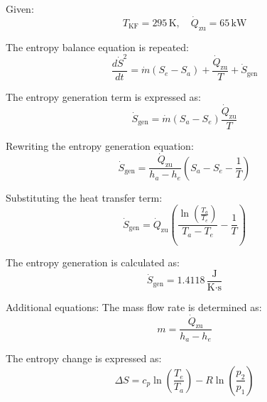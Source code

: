 Given:  
\[
T_{\text{KF}} = 295 \, \text{K}, \quad \dot{Q}_{\text{zu}} = 65 \, \text{kW}
\]

The entropy balance equation is repeated:  
\[
\frac{d\dot{S}^2}{dt} = \dot{m}(S_e - S_a) + \frac{\dot{Q}_{\text{zu}}}{T} + \dot{S}_{\text{gen}}
\]

The entropy generation term is expressed as:  
\[
\dot{S}_{\text{gen}} = \dot{m}(S_a - S_e) \frac{\dot{Q}_{\text{zu}}}{T}
\]

Rewriting the entropy generation equation:  
\[
\dot{S}_{\text{gen}} = \frac{\dot{Q}_{\text{zu}}}{h_a - h_e} \left( S_a - S_e - \frac{1}{T} \right)
\]

Substituting the heat transfer term:  
\[
\dot{S}_{\text{gen}} = \dot{Q}_{\text{zu}} \left( \frac{\ln \left( \frac{T_a}{T_e} \right)}{T_a - T_e} - \frac{1}{T} \right)
\]

The entropy generation is calculated as:  
\[
\dot{S}_{\text{gen}} = 1.4118 \, \frac{\text{J}}{\text{K·s}}
\]

Additional equations:  
The mass flow rate is determined as:  
\[
m = \frac{\dot{Q}_{\text{zu}}}{h_a - h_e}
\]

The entropy change is expressed as:  
\[
\Delta S = c_p \ln \left( \frac{T_e}{T_a} \right) - R \ln \left( \frac{p_2}{p_1} \right)
\]
